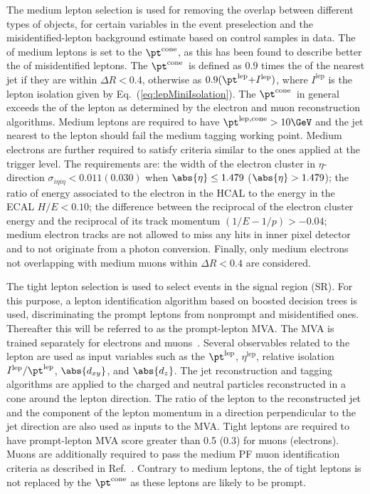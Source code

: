 The medium lepton selection is used for removing the overlap between different types of objects, for certain variables in the event preselection and the misidentified-lepton background estimate based on control samples in data. The \pt of medium leptons is set to the $\pt^{\text{cone}}$, as this has been found to describe better the \pt of misidentified leptons. The $\pt^{\text{cone}}$~is defined as $0.9$ times the \pt of the nearest jet if they are within $\Delta R < 0.4$, otherwise as
$0.9 (\pt^{\text{lep}} {+} I^{\text{lep}})$, where $I^{\text{lep}}$ is the lepton isolation given by Eq.~(\ref{eq:lepMiniIsolation}). The $\pt^{\text{cone}}$~in general exceeds the \pt of the lepton as determined by the electron and muon reconstruction algorithms. Medium leptons are required to have $\pt^{\text{lep},\text{cone}}>10\GeV$ and the jet nearest to the lepton should fail the medium \Pbottom tagging working point. Medium electrons are further required to satisfy criteria similar to the ones applied at the trigger level. The requirements are: the width of the electron cluster in $\eta$-direction $\sigma_{i\eta i\eta}<0.011 (0.030)$ when $\abs{\eta}\leq 1.479$ ($\abs{\eta}> 1.479$); the ratio of energy associated to the electron in the HCAL to the energy in the ECAL $H/E<0.10$; the difference between the reciprocal of the electron cluster energy and the reciprocal of its track momentum $(1/E - 1/p)>-0.04$;
medium electron tracks are not allowed to miss any hits in inner pixel detector and to not originate from a photon conversion. Finally, only medium electrons not overlapping with medium muons within $\Delta R < 0.4$ are considered.




The tight lepton selection is used to select events in the signal region (SR). For this purpose, a lepton identification algorithm based on boosted decision trees is used, discriminating the prompt leptons from nonprompt and misidentified ones. Thereafter this will be referred to as the prompt-lepton MVA. The MVA is trained separately for electrons and muons~\cite{ttHmultilepton}. Several observables related to the lepton are used as input variables such as the $\pt^{\text{lep}}$, $\eta^{\text{lep}}$, relative
isolation $I^{\text{lep}}/\pt^{\text{lep}}$, $\abs{d_{xy}}$, and $\abs{d_{z} }$. The jet reconstruction and \Pbottom tagging algorithms are applied to the charged and neutral particles reconstructed in a cone around the lepton direction. The ratio of the lepton \pt to the reconstructed jet \pt and the component of the lepton momentum in a direction perpendicular to the jet direction are also used as inputs to the MVA. Tight leptons are required to have prompt-lepton MVA score greater than 0.5 (0.3) for muons (electrons). Muons are additionally required to pass the medium PF muon identification criteria as described in Ref.~\cite{MuonID}. Contrary to medium leptons, the \pt of tight leptons is not replaced by the $\pt^{\text{cone}}$ as these leptons are likely to be prompt.

